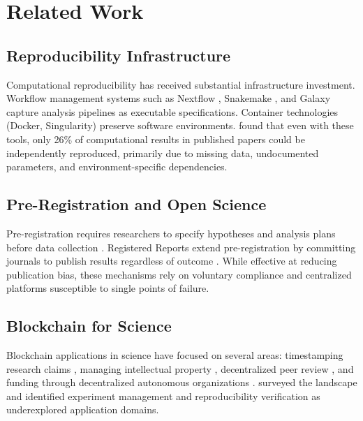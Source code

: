 \section{Related Work}

\label{sec:related}

\subsection{Reproducibility Infrastructure}

Computational reproducibility has received substantial infrastructure investment.
Workflow management systems such as Nextflow \citep{ditommaso2017nextflow}, Snakemake \citep{molder2021sustainable}, and Galaxy \citep{afgan2018galaxy} capture analysis pipelines as executable specifications.
Container technologies (Docker, Singularity) preserve software environments.
\citet{stodden2018empirical} found that even with these tools, only 26\% of computational results in published papers could be independently reproduced, primarily due to missing data, undocumented parameters, and environment-specific dependencies.

\subsection{Pre-Registration and Open Science}

Pre-registration requires researchers to specify hypotheses and analysis plans before data collection \citep{nosek2018preregistration}.
Registered Reports extend pre-registration by committing journals to publish results regardless of outcome \citep{chambers2013registered}.
While effective at reducing publication bias, these mechanisms rely on voluntary compliance and centralized platforms susceptible to single points of failure.

\subsection{Blockchain for Science}

Blockchain applications in science have focused on several areas: timestamping research claims \citep{koepsell2020blockchain}, managing intellectual property \citep{hasan2019blockchain}, decentralized peer review \citep{tenorio2019open}, and funding through decentralized autonomous organizations \citep{wright2021desci}.
\citet{bartling2020blockchain} surveyed the landscape and identified experiment management and reproducibility verification as underexplored application domains.

